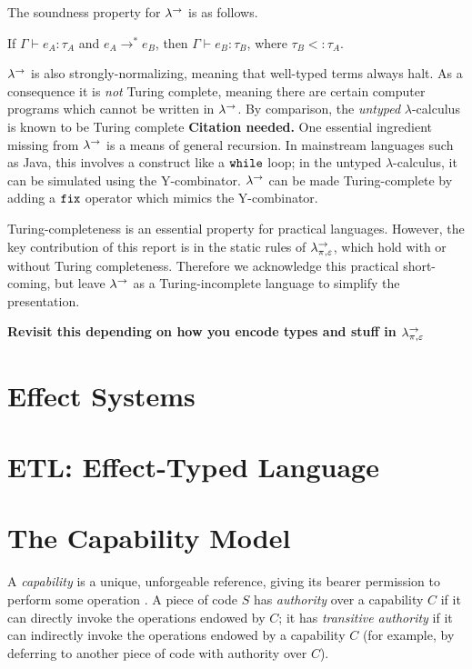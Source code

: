 The soundness property for $\lambda^{\rightarrow}$ is as follows.

\begin{theorem}
If $\Gamma \vdash e_A: \tau_A$ and $e_A \longrightarrow^* e_B$, then $\Gamma \vdash e_B: \tau_B$, where $\tau_B <: \tau_A$.
\end{theorem}

$\lambda^{\rightarrow}$ is also strongly-normalizing, meaning that well-typed terms always halt. As a consequence it is \textit{not} Turing complete, meaning there are certain computer programs which cannot be written in $\lambda^{\rightarrow}$. By comparison, the \textit{untyped} $\lambda$-calculus is known to be Turing complete \textbf{Citation needed.} One essential ingredient missing from $\lambda^{\rightarrow}$ is a means of general recursion. In mainstream languages such as Java, this involves a construct like a $\mathtt{while}$ loop; in the untyped $\lambda$-calculus, it can be simulated using the Y-combinator. $\lambda^{\rightarrow}$ can be made Turing-complete by adding a $\mathtt{fix}$ operator which mimics the Y-combinator.

Turing-completeness is an essential property for practical languages. However, the key contribution of this report is in the static rules of $\lambda^{\rightarrow}_{\pi, \varepsilon}$, which hold with or without Turing completeness. Therefore we acknowledge this practical short-coming, but leave $\lambda^{\rightarrow}$ as a Turing-incomplete language to simplify the presentation.

\textbf{Revisit this depending on how you encode types and stuff in $\lambda^{\rightarrow}_{\pi, \varepsilon}$}


\section{Effect Systems}


\section{ETL: Effect-Typed Language}




\section{The Capability Model}

A \textit{capability} is a unique, unforgeable reference, giving its bearer permission to perform some operation \cite{dennis66}. A piece of code $S$ has \textit{authority} over a capability $C$ if it can directly invoke the operations endowed by $C$; it has \textit{transitive authority} if it can indirectly invoke the operations endowed by a capability $C$ (for example, by deferring to another piece of code with authority over $C$).

